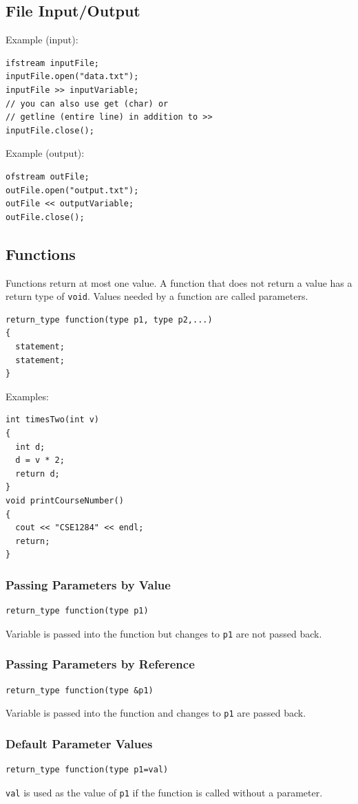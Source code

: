 \documentclass{article}
\begin{document}
\subsection*{File Input/Output}
Example (input):
\begin{verbatim}
ifstream inputFile;
inputFile.open("data.txt");
inputFile >> inputVariable;
// you can also use get (char) or
// getline (entire line) in addition to >>
inputFile.close();
\end{verbatim}
Example (output):
\begin{verbatim}
ofstream outFile;
outFile.open("output.txt");
outFile << outputVariable;
outFile.close();
\end{verbatim}

\subsection*{Functions}
Functions return at most one value. A function that does not return a value has a return type of \texttt{void}. Values needed by a function are called parameters.
\begin{verbatim}
return_type function(type p1, type p2,...)
{
  statement;
  statement;
}
\end{verbatim}
Examples:
\begin{verbatim}
int timesTwo(int v)
{
  int d;
  d = v * 2;
  return d;
}
void printCourseNumber()
{
  cout << "CSE1284" << endl;
  return;
}
\end{verbatim}

\subsubsection*{Passing Parameters by Value}
\begin{verbatim}
return_type function(type p1)
\end{verbatim}
Variable is passed into the function but changes to \texttt{p1} are not passed back.

\subsubsection*{Passing Parameters by Reference}
\begin{verbatim}
return_type function(type &p1)
\end{verbatim}
Variable is passed into the function and changes to \texttt{p1} are passed back.

\subsubsection*{Default Parameter Values}
\begin{verbatim}
return_type function(type p1=val)
\end{verbatim}
\texttt{val} is used as the value of \texttt{p1} if the function is called without a parameter.
\end{document}
